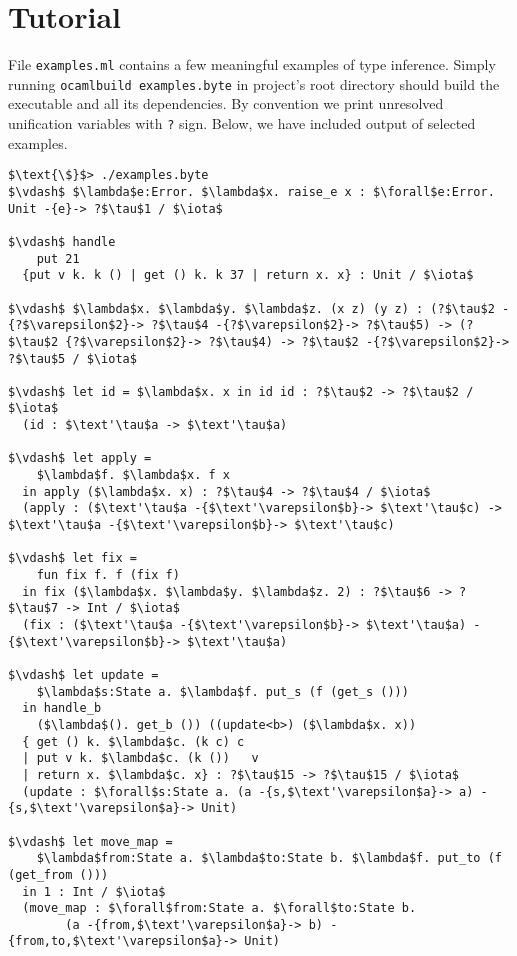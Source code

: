 \documentclass[declaration,shortabstract]{iithesis}
\theoremstyle{definition} \newtheorem{definition}{Definition}[section]
\begin{document}
\section{Tutorial}
File \texttt{examples.ml} contains a few meaningful examples of type inference.
Simply running \texttt{ocamlbuild examples.byte} in project's root directory
should build the executable and all its dependencies.
By convention we print unresolved unification variables with \texttt{?} sign.
Below, we have included output of selected examples.
\begin{lstlisting}
$\text{\$}$> ./examples.byte 
$\vdash$ $\lambda$e:Error. $\lambda$x. raise_e x : $\forall$e:Error. Unit -{e}-> ?$\tau$1 / $\iota$

$\vdash$ handle
    put 21
  {put v k. k () | get () k. k 37 | return x. x} : Unit / $\iota$

$\vdash$ $\lambda$x. $\lambda$y. $\lambda$z. (x z) (y z) : (?$\tau$2 -{?$\varepsilon$2}-> ?$\tau$4 -{?$\varepsilon$2}-> ?$\tau$5) -> (?$\tau$2 {?$\varepsilon$2}-> ?$\tau$4) -> ?$\tau$2 -{?$\varepsilon$2}-> ?$\tau$5 / $\iota$

$\vdash$ let id = $\lambda$x. x in id id : ?$\tau$2 -> ?$\tau$2 / $\iota$
  (id : $\text'\tau$a -> $\text'\tau$a)

$\vdash$ let apply =
    $\lambda$f. $\lambda$x. f x
  in apply ($\lambda$x. x) : ?$\tau$4 -> ?$\tau$4 / $\iota$
  (apply : ($\text'\tau$a -{$\text'\varepsilon$b}-> $\text'\tau$c) -> $\text'\tau$a -{$\text'\varepsilon$b}-> $\text'\tau$c)

$\vdash$ let fix =
    fun fix f. f (fix f)
  in fix ($\lambda$x. $\lambda$y. $\lambda$z. 2) : ?$\tau$6 -> ?$\tau$7 -> Int / $\iota$
  (fix : ($\text'\tau$a -{$\text'\varepsilon$b}-> $\text'\tau$a) -{$\text'\varepsilon$b}-> $\text'\tau$a)

$\vdash$ let update =
    $\lambda$s:State a. $\lambda$f. put_s (f (get_s ()))
  in handle_b
    ($\lambda$(). get_b ()) ((update<b>) ($\lambda$x. x))
  { get () k. $\lambda$c. (k c) c
  | put v k. $\lambda$c. (k ())   v
  | return x. $\lambda$c. x} : ?$\tau$15 -> ?$\tau$15 / $\iota$
  (update : $\forall$s:State a. (a -{s,$\text'\varepsilon$a}-> a) -{s,$\text'\varepsilon$a}-> Unit)

$\vdash$ let move_map =
    $\lambda$from:State a. $\lambda$to:State b. $\lambda$f. put_to (f (get_from ()))
  in 1 : Int / $\iota$
  (move_map : $\forall$from:State a. $\forall$to:State b.
        (a -{from,$\text'\varepsilon$a}-> b) -{from,to,$\text'\varepsilon$a}-> Unit)
\end{lstlisting}
\end{document}
